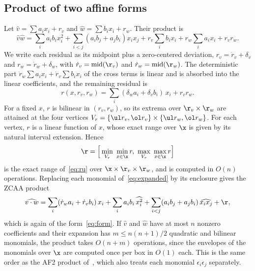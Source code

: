 \documentclass[10pt]{article}
\newcommand{\midp}{\mathrm{mid}}
\begin{document}
\subsection{Product of two affine forms}
\label{sec:product}

Let $\hat v=\sum a_ix_i+r_v$ and $\hat w=\sum b_ix_i+r_w$. Their product is
\begin{equation}
\label{eq:expanded}
\hat v\hat w=\sum_i a_ib_i x_i^2+\sum_{i<j}(a_ib_j+a_jb_i)x_ix_j + r_v\sum_i b_ix_i + r_w\sum_i a_ix_i + r_vr_w.
\end{equation}
We write each residual as its midpoint plus a zero-centered deviation, $r_v=\dot r_v+\delta_v$ and $r_w=\dot r_w+\delta_w$, with $\dot r_v=\midp(\r_v)$ and $\dot r_w=\midp(\r_w)$. The deterministic part $\dot r_w\sum a_ix_i+\dot r_v\sum b_ix_i$ of the cross terms is linear and is absorbed into the linear coefficients, and the remaining residual is
\begin{equation}
\label{eq:ru}
r(x,r_v,r_w)=\sum_i(\delta_w a_i+\delta_v b_i)\,x_i+r_vr_w .
\end{equation}
For a fixed $x$, $r$ is bilinear in $(r_v,r_w)$, so its extrema over $\r_v\times\r_w$ are attained at the four vertices $V_r=\{\ul r_v,\ol r_v\}\times\{\ul r_w,\ol r_w\}$. For each vertex, $r$ is a linear function of $x$, whose exact range over $\x$ is given by its natural interval extension. Hence
\begin{equation}
\label{eq:Rbounds}
\r = \Big[\min_{V_r}\ \min_{x\in\x} r,\ \max_{V_r}\ \max_{x\in\x} r\Big]
\end{equation}
is the exact range of~\eqref{eq:ru} over $\x\times\r_v\times\r_w$, and is computed in $O(n)$ operations. Replacing each monomial of~\eqref{eq:expanded} by its enclosure gives the ZCAA product
\begin{equation}
\label{eq:zcaa-product}
\widehat{v\cdot w}=\sum_i(\dot r_wa_i+\dot r_vb_i)\,x_i+\sum_i a_ib_i\,\widehat{x_i^2}+\sum_{i<j}(a_ib_j+a_jb_i)\,\widehat{x_ix_j}+\r ,
\end{equation}
which is again of the form~\eqref{eq:form}. If $\hat v$ and $\hat w$ have at most $n$ nonzero coefficients and their expansion has $m\le n(n+1)/2$ quadratic and bilinear monomials, the product takes $O(n+m)$ operations, since the envelopes of the monomials over $\x$ are computed once per box in $O(1)$ each. This is the same order as the AF2 product of~\cite{messine2002extentions}, which also treats each monomial $\epsilon_i\epsilon_j$ separately.
\end{document}
